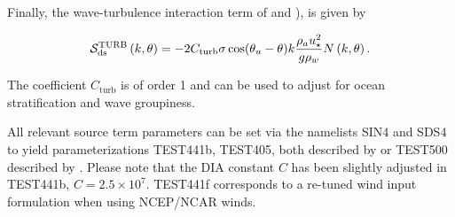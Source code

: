 Finally, the wave-turbulence interaction term of \cite{art:TB02} and \cite{art:AJ06}),
is given by

\begin{equation}
{\cal S}_{\mathrm{ds}}^{\mathrm{TURB}}\left(k,\theta\right) = - 2
C_{\mathrm{turb}} \sigma \cos(\theta_u - \theta) k \frac{\rho_a
u_\star^2}{g \rho_w}  N\left(k,\theta\right) .
\end{equation}

\noindent
The coefficient $C_{\mathrm{turb}}$ is of order 1 and can be used to adjust for
ocean stratification and wave groupiness.

All relevant source term parameters can be set via the namelists SIN4 and SDS4
to yield parameterizations TEST441b, TEST405, both described by
\cite{art:Aea10} or TEST500 described by \cite{art:FA12}. Please note that the
DIA constant $C$ has been slightly adjusted in TEST441b, $C=2.5\times
10^7$. TEST441f corresponds to a re-tuned wind input formulation when using
NCEP/NCAR winds.
